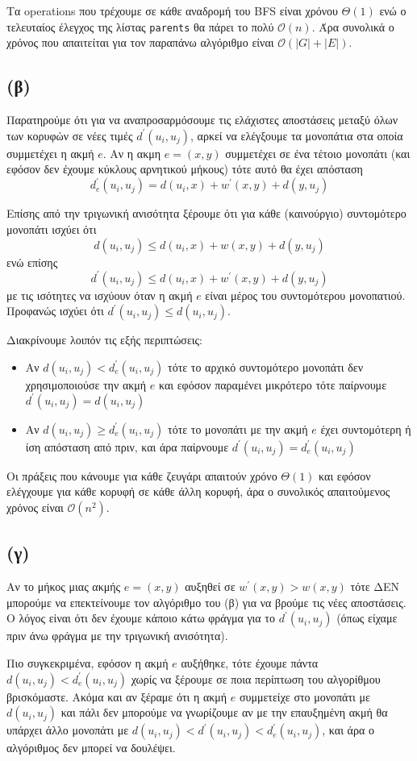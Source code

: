 \documentclass[a4paper,11pt]{article}
\begin{document}
Τα operations που τρέχουμε σε κάθε αναδρομή του BFS είναι χρόνου $\Theta(1)$ ενώ ο τελευταίος έλεγχος της λίστας \verb|parents| θα πάρει το πολύ $\mathcal{O}(n)$. Άρα συνολικά ο χρόνος που απαιτείται για τον παραπάνω αλγόριθμο είναι $\mathcal{O}(|G|+|E|)$.

\subsection*{(β)}
Παρατηρούμε ότι για να αναπροσαρμόσουμε τις ελάχιστες αποστάσεις μεταξύ όλων των κορυφών σε νέες τιμές $d^\prime(u_i,u_j)$, αρκεί να ελέγξουμε τα μονοπάτια στα οποία συμμετέχει η ακμή $e$. Αν η ακμη $e = (x,y)$ συμμετέχει σε ένα τέτοιο μονοπάτι (και εφόσον δεν έχουμε κύκλους αρνητικού μήκους) τότε αυτό θα έχει απόσταση
$$d_e^\prime(u_i,u_j) = d(u_i,x) + w^\prime(x,y) + d(y,u_j)$$

Επίσης από την τριγωνική ανισότητα ξέρουμε ότι για κάθε (καινούργιο) συντομότερο μονοπάτι ισχύει ότι
$$d(u_i,u_j) \leq d(u_i,x) + w(x,y) + d(y,u_j)$$
ενώ επίσης
$$d^\prime(u_i,u_j) \leq d(u_i,x) + w^\prime(x,y) + d(y,u_j)$$
με τις ισότητες να ισχύουν όταν η ακμή $e$ είναι μέρος του συντομότερου μονοπατιού. Προφανώς ισχύει ότι $d^\prime(u_i,u_j) \leq d(u_i,u_j)$.

Διακρίνουμε λοιπόν τις εξής περιπτώσεις:
\begin{itemize}
  \item Αν $d(u_i,u_j) < d_e^\prime(u_i,u_j)$ τότε το αρχικό συντομότερο μονοπάτι δεν χρησιμοποιούσε την ακμή $e$ και εφόσον παραμένει μικρότερο τότε παίρνουμε $d^\prime(u_i,u_j) = d(u_i,u_j)$
  \item Αν $d(u_i,u_j) \geq d_e^\prime(u_i,u_j)$ τότε το μονοπάτι με την ακμή $e$ έχει συντομότερη ή ίση απόσταση από πριν, και άρα παίρνουμε $d^\prime(u_i,u_j) = d_e^\prime(u_i,u_j)$
\end{itemize}
  
Οι πράξεις που κάνουμε για κάθε ζευγάρι απαιτούν χρόνο $\Theta(1)$ και εφόσον ελέγχουμε για κάθε κορυφή σε κάθε άλλη κορυφή, άρα ο συνολικός απαιτούμενος χρόνος είναι $\mathcal{O}(n^2)$.

\subsection*{(γ)}
Αν το μήκος μιας ακμής $e = (x,y)$ αυξηθεί σε $w^\prime(x,y) > w(x,y)$ τότε ΔΕΝ μπορούμε να επεκτείνουμε τον αλγόριθμο του (β) για να βρούμε τις νέες αποστάσεις. Ο λόγος είναι ότι δεν έχουμε κάποιο κάτω φράγμα για το $d^\prime(u_i,u_j)$ (όπως είχαμε πριν άνω φράγμα με την τριγωνική ανισότητα).

Πιο συγκεκριμένα, εφόσον η ακμή $e$ αυξήθηκε, τότε έχουμε πάντα
$d(u_i,u_j) < d_e^\prime(u_i,u_j)$ χωρίς να ξέρουμε σε ποια περίπτωση του αλγορίθμου βρισκόμαστε. Ακόμα και αν ξέραμε ότι η ακμή $e$ συμμετείχε στο μονοπάτι με $d(u_i,u_j)$ και πάλι δεν μπορούμε να γνωρίζουμε αν με την επαυξημένη ακμή θα υπάρχει άλλο μονοπάτι με $d(u_i,u_j) < d^\prime(u_i,u_j) < d_e^\prime(u_i,u_j)$, και άρα ο αλγόριθμος δεν μπορεί να δουλέψει.
\end{document}
